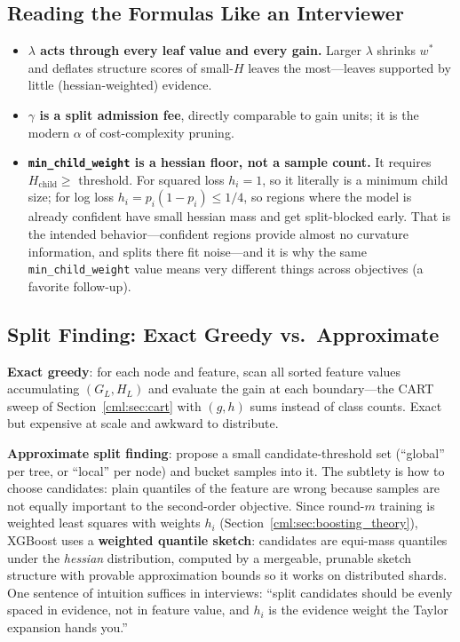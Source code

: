 \subsection{Reading the Formulas Like an Interviewer}

\begin{itemize}
    \item \textbf{$\lambda$ acts through every leaf value and every gain.} Larger $\lambda$ shrinks $w^*$ and deflates structure scores of small-$H$ leaves the most---leaves supported by little (hessian-weighted) evidence.
    \item \textbf{$\gamma$ is a split admission fee}, directly comparable to gain units; it is the modern $\alpha$ of cost-complexity pruning.
    \item \textbf{\texttt{min\_child\_weight} is a hessian floor, not a sample count.} It requires $H_{\text{child}} \ge$ threshold. For squared loss $h_i = 1$, so it literally is a minimum child size; for log loss $h_i = p_i(1-p_i) \le 1/4$, so regions where the model is already confident have small hessian mass and get split-blocked early. That is the intended behavior---confident regions provide almost no curvature information, and splits there fit noise---and it is why the same \texttt{min\_child\_weight} value means very different things across objectives (a favorite follow-up).
\end{itemize}

\subsection{Split Finding: Exact Greedy vs.\ Approximate}

\textbf{Exact greedy}: for each node and feature, scan all sorted feature values accumulating $(G_L, H_L)$ and evaluate the gain at each boundary---the CART sweep of Section~\ref{cml:sec:cart} with $(g, h)$ sums instead of class counts. Exact but expensive at scale and awkward to distribute.

\textbf{Approximate split finding}: propose a small candidate-threshold set (``global'' per tree, or ``local'' per node) and bucket samples into it. The subtlety is how to choose candidates: plain quantiles of the feature are wrong because samples are not equally important to the second-order objective. Since round-$m$ training is weighted least squares with weights $h_i$ (Section~\ref{cml:sec:boosting_theory}), XGBoost uses a \textbf{weighted quantile sketch}: candidates are equi-mass quantiles under the \textit{hessian} distribution, computed by a mergeable, prunable sketch structure with provable approximation bounds so it works on distributed shards. One sentence of intuition suffices in interviews: ``split candidates should be evenly spaced in evidence, not in feature value, and $h_i$ is the evidence weight the Taylor expansion hands you.''

